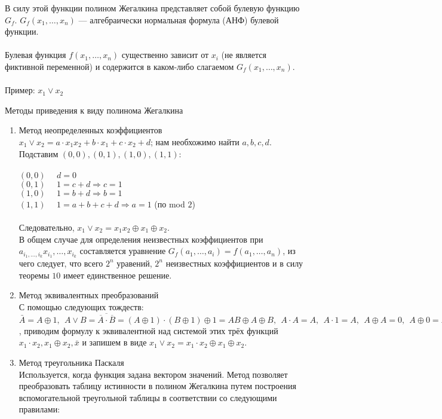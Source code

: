\documentclass[a4paper, 12pt]{report}
\begin{document}
В силу этой функции полином Жегалкина представляет собой булевую функцию $G_f$.  $G_f(x_1,\dotso,x_n)$ — алгебраически нормальная формула (АНФ) булевой функции. \\\\
Булевая функция $f(x_1,\dotso,x_n)$ существенно зависит от $x_i$ (не является фиктивной переменной) и содержится в каком-либо слагаемом $G_f(x_1,\dotso,x_n)$.\\\\
Пример: $x_1\vee x_2$
\begin{center}
	Методы приведения к виду полинома Жегалкина
 \end{center}
\begin{enumerate}
    \item Метод неопределенных коэффициентов\\ 
$x_1 \vee x_2 = a\cdot x_1x_2 + b\cdot x_1 + c\cdot x_2 +d$; нам необхожимо найти $a, b, c, d$.
Подставим  $(0, 0), (0, 1), (1, 0), (1, 1)$:\\\\
$(0,0)	~~~~~~ d=0$\\
$(0,1)	~~~~~~ 1=c+d \Rightarrow c=1$\\
$(1,0)	~~~~~~ 1=b+d \Rightarrow b=1$\\
$(1,1)	~~~~~~ 1=a+b+c+d \Rightarrow a=1$ (по mod $2$)\\\\
Следовательно, $x_1\vee x_2 = x_1x_2\oplus x_1\oplus x_2$.\\
В общем случае для определения неизвестных коэффициентов при $a_{i_1, \dotso, i_k} x_{i_1}, \dotso, x_{i_k}$ составляется уравнение $G_f(a_1, \dotso, a_i) = f(a_1, \dotso, a_n)$, из чего следует, что всего $2^n$ уравений, $2^n$ неизвестных коэффициентов и в силу теоремы $10$ имеет единственное решение.
\item	Метод эквивалентных преобразований\\
С помощью следующих тождеств: $\bar A=A\oplus 1, ~~ A\vee B = \overline{\overline{A} \cdot \overline{B}} = (A\oplus 1) \cdot (B\oplus 1) \oplus 1 = AB \oplus A \oplus B,~~ A\cdot A=A, ~~ A\cdot 1=A,~~ A\oplus A=0,~~ A\oplus 0=A$, приводим формулу к эквивалентной над системой этих трёх функций ${x_1\cdot x_2, x_1\oplus x_2, \bar x}$ и запишем в виде
 $x_1\vee x_2 = x_1\cdot x_2\oplus x_1\oplus x_2$.
\item Метод треугольника Паскаля \\
Используется, когда функция задана вектором значений. Метод позволяет преобразовать таблицу истинности в полином Жегалкина путем построения вспомогательной треугольной таблицы в соответствии со следующими правилами:

\end{enumerate}
\end{document}
